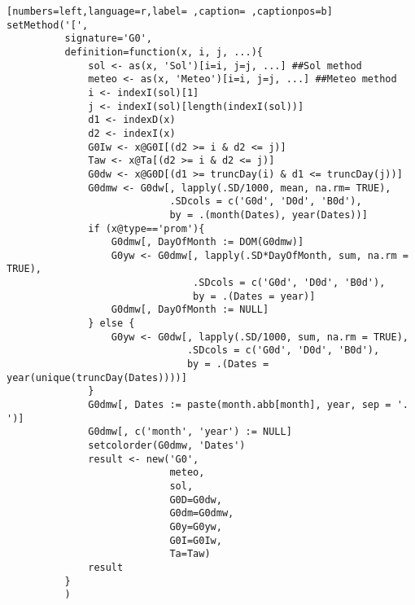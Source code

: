\begin{lstlisting}[numbers=left,language=r,label= ,caption= ,captionpos=b]
setMethod('[',
          signature='G0',
          definition=function(x, i, j, ...){
              sol <- as(x, 'Sol')[i=i, j=j, ...] ##Sol method
              meteo <- as(x, 'Meteo')[i=i, j=j, ...] ##Meteo method
              i <- indexI(sol)[1]
              j <- indexI(sol)[length(indexI(sol))]
              d1 <- indexD(x)
              d2 <- indexI(x)
              G0Iw <- x@G0I[(d2 >= i & d2 <= j)]
              Taw <- x@Ta[(d2 >= i & d2 <= j)]
              G0dw <- x@G0D[(d1 >= truncDay(i) & d1 <= truncDay(j))]
              G0dmw <- G0dw[, lapply(.SD/1000, mean, na.rm= TRUE),
                            .SDcols = c('G0d', 'D0d', 'B0d'),
                            by = .(month(Dates), year(Dates))]
              if (x@type=='prom'){
                  G0dmw[, DayOfMonth := DOM(G0dmw)]
                  G0yw <- G0dmw[, lapply(.SD*DayOfMonth, sum, na.rm = TRUE),
                                .SDcols = c('G0d', 'D0d', 'B0d'),
                                by = .(Dates = year)]
                  G0dmw[, DayOfMonth := NULL]
              } else {
                  G0yw <- G0dw[, lapply(.SD/1000, sum, na.rm = TRUE),
                               .SDcols = c('G0d', 'D0d', 'B0d'),
                               by = .(Dates = year(unique(truncDay(Dates))))]
              }
              G0dmw[, Dates := paste(month.abb[month], year, sep = '. ')]
              G0dmw[, c('month', 'year') := NULL]
              setcolorder(G0dmw, 'Dates')
              result <- new('G0',
                            meteo,
                            sol,
                            G0D=G0dw,
                            G0dm=G0dmw,
                            G0y=G0yw,
                            G0I=G0Iw,
                            Ta=Taw)
              result
          }
          )



\end{lstlisting}
